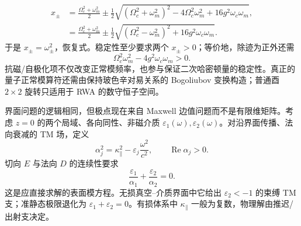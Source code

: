 \begin{exbox}
\begin{align*}
 x_\pm
 &=\frac{\Omega_c^2+\omega_m^2}{2}
 \pm\frac12\sqrt{(\Omega_c^2+\omega_m^2)^2
 -4\Omega_c^2\omega_m^2+16g^2\omega_c\omega_m},\\
 &=\frac{\Omega_c^2+\omega_m^2}{2}
 \pm\frac12\sqrt{(\Omega_c^2-\omega_m^2)^2
 +16g^2\omega_c\omega_m}.
\end{align*}
于是 $x_\pm=\omega_\pm^2$，恢复式。稳定性至少要求两个 $x_\pm>0$；等价地，除迹为正外还需
\begin{equation*}
 \Omega_c^2\omega_m^2-4g^2\omega_c\omega_m>0.
\end{equation*}
抗磁/自极化项不仅改变正常模频率，也参与保证二次哈密顿量的稳定性。真正的量子正常模算符还需由保持玻色辛对易关系的 Bogoliubov 变换构造；普通酉 $2\times2$ 旋转只适用于 RWA 的数守恒子空间。
\end{exbox}

界面问题的逻辑相同，但极点现在来自 Maxwell 边值问题而不是有限维矩阵。考虑 $z=0$ 的两个局域、各向同性、非磁介质 $\varepsilon_1(\omega),\varepsilon_2(\omega)$。对沿界面传播、法向衰减的 TM 场，定义
\begin{equation*}
\alpha_j^2=\kappa_\parallel^2-\varepsilon_j\frac{\omega^2}{c^2},
\qquad
\operatorname{Re}\alpha_j>0.
\end{equation*}
切向 $E$ 与法向 $D$ 的连续性要求
\begin{equation}
{
\frac{\varepsilon_1}{\alpha_1}+\frac{\varepsilon_2}{\alpha_2}=0.}
\label{eq:tm_surface_mode_condition}
\end{equation}
这是应直接求解的表面模方程。无损真空--介质界面中它给出 $\varepsilon_2<-1$ 的束缚 TM 支；准静态极限退化为 $\varepsilon_1+\varepsilon_2=0$。有损体系中 $\kappa_\parallel$ 一般为复数，物理解由推迟/出射支决定。

